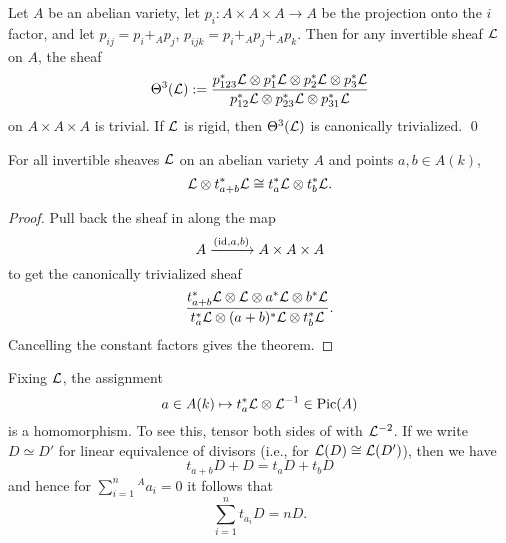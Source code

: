 \begin{corollary}\label{Theta3IsTrivial}
Let $A$ be an abelian variety, let $p_i: A \times A \times A \to A$ be the projection onto the $i${\th} factor, and let $p_{ij} = p_i +_A p_j$, $p_{ijk} = p_i +_A p_j +_A p_k$.  Then for any invertible sheaf $\mathcal{L}$ on $A$, the sheaf \[\Theta^3(\mathcal{L}) := \frac{p_{123}^* \mathcal{L} \otimes p_1^* \mathcal{L} \otimes p_2^* \mathcal{L} \otimes p_3^* \mathcal{L}}{p_{12}^* \mathcal{L} \otimes p_{23}^* \mathcal{L} \otimes p_{31}^* \mathcal{L}}\] on $A \times A \times A$ is trivial.  If $\mathcal{L}$ is rigid, then $\Theta^3(\mathcal{L})$ is canonically trivialized. \qed
\end{corollary}

\begin{theorem}\label{TheoremOfTheSquare}
For all invertible sheaves $\mathcal{L}$ on an abelian variety $A$ and points $a, b \in A(k)$, \[\mathcal{L} \otimes t_{a+b}^* \mathcal{L} \cong t_a^* \mathcal{L} \otimes t_b^* \mathcal{L}.\]
\end{theorem}
\begin{proof}
Pull back the sheaf in  along the map \[A \xrightarrow{(\mathrm{id}, a, b)} A \times A \times A\] to get the canonically trivialized sheaf \[\frac{t_{a+b}^* \mathcal{L} \otimes \mathcal{L} \otimes a^* \mathcal{L} \otimes b^* \mathcal{L}}{t_a^* \mathcal{L} \otimes (a+b)^* \mathcal{L} \otimes t_b^* \mathcal{L}}.\]  Cancelling the constant factors gives the theorem.
\end{proof}

\begin{remark}
Fixing $\mathcal{L}$, the assignment \[a \in A(k) \mapsto t_a^* \mathcal{L} \otimes \mathcal{L}^{-1} \in \operatorname{Pic}(A)\] is a homomorphism.  To see this, tensor both sides of  with $\mathcal{L}^{-2}$.  If we write $D \simeq D'$ for linear equivalence of divisors (i.e., for $\mathcal{L}(D) \cong \mathcal{L}(D')$), then we have \[t_{a+b} D + D = t_a D + t_b D\] and hence for $\sum_{i=1}^n{}^A a_i = 0$ it follows that \[\sum_{i=1}^n t_{a_i} D = nD.\]
\end{remark}


